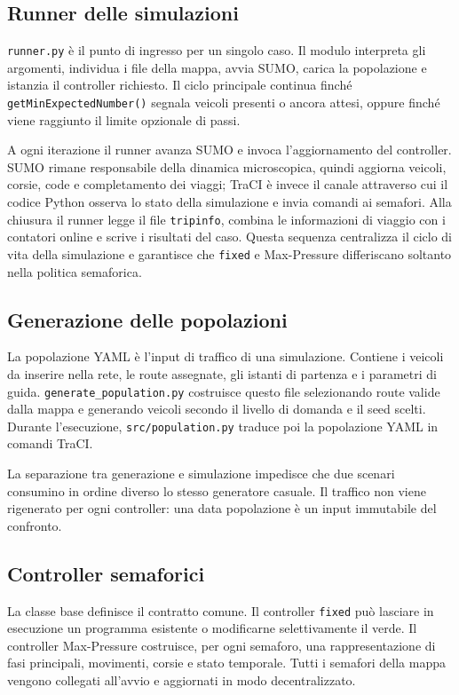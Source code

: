 \documentclass[12pt,a4paper,oneside]{report}
\numberwithin{equation}{chapter}
\begin{document}
\subsection{Runner delle simulazioni}

\texttt{runner.py} è il punto di ingresso per un singolo caso. Il modulo
interpreta gli argomenti, individua i file della mappa, avvia SUMO, carica la
popolazione e istanzia il controller richiesto. Il ciclo principale continua
finché \texttt{getMinExpectedNumber()} segnala veicoli presenti o ancora attesi,
oppure finché viene raggiunto il limite opzionale di passi.

A ogni iterazione il runner avanza SUMO e invoca l'aggiornamento del
controller. SUMO rimane responsabile della dinamica microscopica, quindi
aggiorna veicoli, corsie, code e completamento dei viaggi; TraCI è invece il
canale attraverso cui il codice Python osserva lo stato della simulazione e
invia comandi ai semafori. Alla chiusura il runner legge il file
\texttt{tripinfo}, combina le informazioni di viaggio con i contatori online e
scrive i risultati del caso. Questa sequenza centralizza il ciclo di vita della
simulazione e garantisce che \texttt{fixed} e Max-Pressure differiscano soltanto nella
politica semaforica.

\subsection{Generazione delle popolazioni}

La popolazione YAML è l'input di traffico di una simulazione. Contiene i veicoli
da inserire nella rete, le route assegnate, gli istanti di partenza e i
parametri di guida. \texttt{generate\_population.py} costruisce questo file
selezionando route valide dalla mappa e generando veicoli secondo il livello di
domanda e il seed scelti. Durante l'esecuzione, \texttt{src/population.py}
traduce poi la popolazione YAML in comandi TraCI.

La separazione tra generazione e simulazione impedisce che due scenari
consumino in ordine diverso lo stesso generatore casuale. Il traffico non viene
rigenerato per ogni controller: una data popolazione è un input immutabile del
confronto.

\subsection{Controller semaforici}

La classe base definisce il contratto comune. Il controller \texttt{fixed} può lasciare
in esecuzione un programma esistente o modificarne selettivamente il verde. Il
controller Max-Pressure costruisce, per ogni semaforo, una rappresentazione di
fasi principali, movimenti, corsie e stato temporale. Tutti i semafori della
mappa vengono collegati all'avvio e aggiornati in modo decentralizzato.
\end{document}
